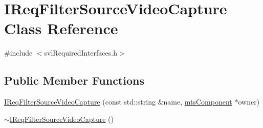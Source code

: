 \hypertarget{class_i_req_filter_source_video_capture}{}\section{I\+Req\+Filter\+Source\+Video\+Capture Class Reference}
\label{class_i_req_filter_source_video_capture}


{\ttfamily \#include $<$svl\+Required\+Interfaces.\+h$>$}

\subsection*{Public Member Functions}
\begin{DoxyCompactItemize}
\item 
\hyperlink{class_i_req_filter_source_video_capture_ac45bb4ea00b746197a790b1e7ce8929e}{I\+Req\+Filter\+Source\+Video\+Capture} (const std\+::string \&name, \hyperlink{classmts_component}{mts\+Component} $\ast$owner)
\item 
\hyperlink{class_i_req_filter_source_video_capture_a45eca1d8c0daeccc6cb4a821922f7e9e}{$\sim$\+I\+Req\+Filter\+Source\+Video\+Capture} ()
\end{DoxyCompactItemize}
